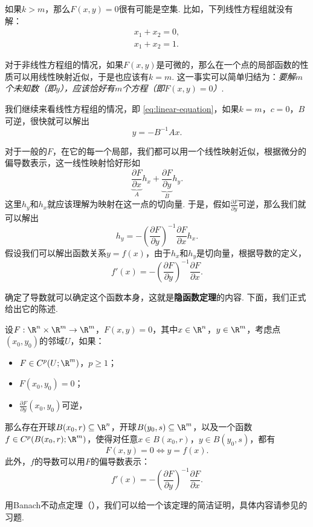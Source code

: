 如果$k>m$，那么$F(x,y)=0$很有可能是空集. 比如，下列线性方程组就没有解：
\begin{gather*}
    x_1+x_2=0, \\
    x_1+x_2=1.
\end{gather*}

对于非线性方程组的情况，如果$F(x,y)$是可微的，那么在一个点的局部函数的性质可以用线性映射近似，于是也应该有$k=m$. 这一事实可以简单归结为：\emph{要解$m$个未知数（即$y$），应该恰好有$m$个方程（即$F(x,y)=0$）}.

我们继续来看线性方程组的情况，即 \eqref{eq:linear-equation}，如果$k=m$，$c=0$，$B$可逆，很快就可以解出
\[y=-B^{-1}Ax.\]

对于一般的$F$，在它的每一个局部，我们都可以用一个线性映射近似，根据微分的偏导数表示，这一线性映射恰好形如
\[\underbrace{\frac{\partial F}{\partial x}}_A h_x+\underbrace{\frac{\partial F}{\partial y}}_B h_y.\]
这里$h_y$和$h_x$就应该理解为映射在这一点的切向量. 
于是，假如$\frac{\partial F}{\partial y}$可逆，那么我们就可以解出
\[h_y=-\left(\frac{\partial F}{\partial y}\right)^{-1}\frac{\partial F}{\partial x}h_x.\]
假设我们可以解出函数关系$y=f(x)$，由于$h_x$和$h_y$是切向量，根据导数的定义，
\[f'(x)=-\left(\frac{\partial F}{\partial y}\right)^{-1}\frac{\partial F}{\partial x}.\]

确定了导数就可以确定这个函数本身，这就是\textbf{隐函数定理}的内容. 下面，我们正式给出它的陈述. 

\begin{theorem}[隐函数定理]\label{thm:implicit-function}
    设$F:\R^n\times\R^m\to\R^m$，$F(x,y)=0$，其中$x\in\R^n$，$y\in\R^m$，考虑点$(x_0,y_0)$的邻域$U$，如果：
    \begin{itemize}
        \item $F\in C^p(U;\R^m)$，$p\geq 1$；
        \item $F(x_0,y_0)=0$；
        \item $\frac{\partial F}{\partial y}(x_0,y_0)$可逆，
    \end{itemize}
    那么存在开球$B(x_0,r)\subseteq\R^n$，开球$B(y_0,s)\subseteq\R^m$，以及一个函数$f\in C^p(B(x_0,r);\R^m)$，使得对任意$x\in B(x_0,r)$，$y\in B(y_0,s)$，都有
    \[F(x,y)=0\iff y=f(x).\]
    此外，$f$的导数可以用$F$的偏导数表示：
    \[f'(x)=-\left(\frac{\partial F}{\partial y}\right)^{-1}\frac{\partial F}{\partial x}.\]
\end{theorem}

用Banach不动点定理（），我们可以给一个该定理的简洁证明，具体内容请参见的习题. 

